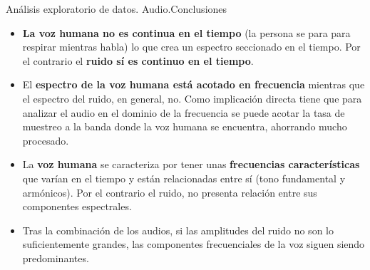 \begin{frame}{Análisis exploratorio de datos. Audio.\newline Conclusiones}
	\begin{itemize}
		\item \textbf{La voz humana no es continua en el tiempo} (la persona se para para respirar mientras habla) lo que crea un espectro seccionado en el tiempo. Por el contrario el \textbf{ruido sí es continuo en el tiempo}.
		\vspace{10pt}
		\item El \textbf{espectro de la voz humana está acotado en frecuencia} mientras que el espectro del ruido, en general, no. Como implicación directa tiene que para analizar el audio en el dominio de la frecuencia se puede acotar la tasa de muestreo a la banda donde la voz humana se encuentra, ahorrando mucho procesado.
		\vspace{10pt}
		\item La \textbf{voz humana} se caracteriza por tener unas \textbf{frecuencias características} que varían en el tiempo y están relacionadas entre sí (tono fundamental y armónicos). Por el contrario el ruido, no presenta relación entre sus componentes espectrales.
		\vspace{10pt}
		\item Tras la combinación de los audios, si las amplitudes del ruido no son lo suficientemente grandes, las componentes frecuenciales de la voz siguen siendo predominantes.
	\end{itemize}
\end{frame}